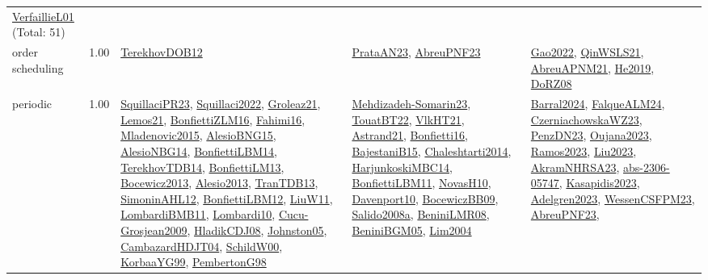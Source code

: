 {\begin{longtable}{p{3cm}r>{\raggedright\arraybackslash}p{6cm}>{\raggedright\arraybackslash}p{6cm}>{\raggedright\arraybackslash}p{8cm}}
\hyperref[detail:VerfaillieL01]{VerfaillieL01} (Total: 51)\\
\index{order scheduling}\index{Concepts!order scheduling}order scheduling &  1.00 & \hyperref[detail:TerekhovDOB12]{TerekhovDOB12} & \hyperref[detail:PrataAN23]{PrataAN23}, \hyperref[detail:AbreuPNF23]{AbreuPNF23} & \hyperref[detail:Gao2022]{Gao2022}, \hyperref[detail:QinWSLS21]{QinWSLS21}, \hyperref[detail:AbreuAPNM21]{AbreuAPNM21}, \hyperref[detail:He2019]{He2019}, \hyperref[detail:DoRZ08]{DoRZ08}\\
\index{periodic}\index{Concepts!periodic}periodic &  1.00 & \hyperref[detail:SquillaciPR23]{SquillaciPR23}, \hyperref[detail:Squillaci2022]{Squillaci2022}, \hyperref[detail:Groleaz21]{Groleaz21}, \hyperref[detail:Lemos21]{Lemos21}, \hyperref[detail:BonfiettiZLM16]{BonfiettiZLM16}, \hyperref[detail:Fahimi16]{Fahimi16}, \hyperref[detail:Mladenovic2015]{Mladenovic2015}, \hyperref[detail:AlesioBNG15]{AlesioBNG15}, \hyperref[detail:AlesioNBG14]{AlesioNBG14}, \hyperref[detail:BonfiettiLBM14]{BonfiettiLBM14}, \hyperref[detail:TerekhovTDB14]{TerekhovTDB14}, \hyperref[detail:BonfiettiLM13]{BonfiettiLM13}, \hyperref[detail:Bocewicz2013]{Bocewicz2013}, \hyperref[detail:Alesio2013]{Alesio2013}, \hyperref[detail:TranTDB13]{TranTDB13}, \hyperref[detail:SimoninAHL12]{SimoninAHL12}, \hyperref[detail:BonfiettiLBM12]{BonfiettiLBM12}, \hyperref[detail:LiuW11]{LiuW11}, \hyperref[detail:LombardiBMB11]{LombardiBMB11}, \hyperref[detail:Lombardi10]{Lombardi10}, \hyperref[detail:Cucu-Grosjean2009]{Cucu-Grosjean2009}, \hyperref[detail:HladikCDJ08]{HladikCDJ08}, \hyperref[detail:Johnston05]{Johnston05}, \hyperref[detail:CambazardHDJT04]{CambazardHDJT04}, \hyperref[detail:SchildW00]{SchildW00}, \hyperref[detail:KorbaaYG99]{KorbaaYG99}, \hyperref[detail:PembertonG98]{PembertonG98} & \hyperref[detail:Mehdizadeh-Somarin23]{Mehdizadeh-Somarin23}, \hyperref[detail:TouatBT22]{TouatBT22}, \hyperref[detail:VlkHT21]{VlkHT21}, \hyperref[detail:Astrand21]{Astrand21}, \hyperref[detail:Bonfietti16]{Bonfietti16}, \hyperref[detail:BajestaniB15]{BajestaniB15}, \hyperref[detail:Chaleshtarti2014]{Chaleshtarti2014}, \hyperref[detail:HarjunkoskiMBC14]{HarjunkoskiMBC14}, \hyperref[detail:BonfiettiLBM11]{BonfiettiLBM11}, \hyperref[detail:NovasH10]{NovasH10}, \hyperref[detail:Davenport10]{Davenport10}, \hyperref[detail:BocewiczBB09]{BocewiczBB09}, \hyperref[detail:Salido2008a]{Salido2008a}, \hyperref[detail:BeniniLMR08]{BeniniLMR08}, \hyperref[detail:BeniniBGM05]{BeniniBGM05}, \hyperref[detail:Lim2004]{Lim2004} & \hyperref[detail:Barral2024]{Barral2024}, \hyperref[detail:FalqueALM24]{FalqueALM24}, \hyperref[detail:CzerniachowskaWZ23]{CzerniachowskaWZ23}, \hyperref[detail:PenzDN23]{PenzDN23}, \hyperref[detail:Oujana2023]{Oujana2023}, \hyperref[detail:Ramos2023]{Ramos2023}, \hyperref[detail:Liu2023]{Liu2023}, \hyperref[detail:AkramNHRSA23]{AkramNHRSA23}, \hyperref[detail:abs-2306-05747]{abs-2306-05747}, \hyperref[detail:Kasapidis2023]{Kasapidis2023}, \hyperref[detail:Adelgren2023]{Adelgren2023}, \hyperref[detail:WessenCSFPM23]{WessenCSFPM23}, \hyperref[detail:AbreuPNF23]{AbreuPNF23}, 
\end{longtable}}
